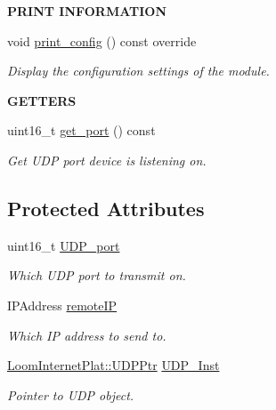 \begin{Indent}{\bf P\+R\+I\+NT I\+N\+F\+O\+R\+M\+A\+T\+I\+ON}\par
\begin{DoxyCompactItemize}
\item 
void \hyperlink{class_loom___max_pub_a9286db7e281484d00233dc4d86012197}{print\+\_\+config} () const override
\begin{DoxyCompactList}\small\item\em Display the configuration settings of the module. \end{DoxyCompactList}\end{DoxyCompactItemize}
\end{Indent}
\begin{Indent}{\bf G\+E\+T\+T\+E\+RS}\par
\begin{DoxyCompactItemize}
\item 
uint16\+\_\+t \hyperlink{class_loom___max_pub_aadc82ca62997907eda950c8f9d3dd4a8}{get\+\_\+port} () const 
\begin{DoxyCompactList}\small\item\em Get U\+DP port device is listening on. \end{DoxyCompactList}\end{DoxyCompactItemize}
\end{Indent}
\subsection*{Protected Attributes}
\begin{DoxyCompactItemize}
\item 
uint16\+\_\+t \hyperlink{class_loom___max_pub_aabdb739b93a98972610d836d2f4ace19}{U\+D\+P\+\_\+port}
\begin{DoxyCompactList}\small\item\em Which U\+DP port to transmit on. \end{DoxyCompactList}\item 
I\+P\+Address \hyperlink{class_loom___max_pub_a61f53dddbf95967c3e34f19a159e9e15}{remote\+IP}
\begin{DoxyCompactList}\small\item\em Which IP address to send to. \end{DoxyCompactList}\item 
\hyperlink{class_loom_internet_plat_a0b2cc742a6ac5f4f7054b75ea99b345c}{Loom\+Internet\+Plat\+::\+U\+D\+P\+Ptr} \hyperlink{class_loom___max_pub_a39f9cb9d6c5bc08bc4f2c164ab834620}{U\+D\+P\+\_\+\+Inst}
\begin{DoxyCompactList}\small\item\em Pointer to U\+DP object. \end{DoxyCompactList}\end{DoxyCompactItemize}
